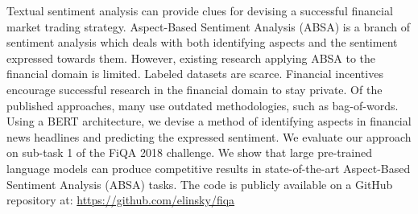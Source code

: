 Textual sentiment analysis can provide clues for devising a successful financial market trading strategy. Aspect-Based Sentiment Analysis (ABSA) is a branch of sentiment analysis which deals with both identifying aspects and the sentiment expressed towards them.
However, existing research applying ABSA to the financial domain is limited.
Labeled datasets are scarce.
Financial incentives encourage successful research in the financial domain to stay private.
Of the published approaches, many use outdated methodologies, such as bag-of-words.
Using a BERT architecture, we devise a method of identifying aspects in financial news headlines and predicting the expressed sentiment.
We evaluate our approach on sub-task 1 of the FiQA 2018 challenge.
We show that large pre-trained language models can produce competitive results in state-of-the-art Aspect-Based Sentiment Analysis (ABSA) tasks.
The code is publicly available on a GitHub repository at: \href{https://github.com/elinsky/fiqa}{https://github.com/elinsky/fiqa}
